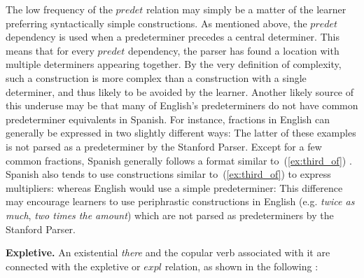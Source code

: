 \documentclass[main.tex]{subfiles}
\begin{document}
The low frequency of the $predet$ relation may simply be a matter of the learner preferring syntactically simple constructions. As mentioned above, the $predet$ dependency is used when a predeterminer precedes a central determiner. This means that for every $predet$ dependency, the parser has found a location with multiple determiners appearing together. By the very definition of complexity, such a construction is more complex than a construction with a single determiner, and thus likely to be avoided by the learner. Another likely source of this underuse may be that many of English's predeterminers do not have common predeterminer equivalents in Spanish. For instance, fractions in English can generally be expressed in two slightly different ways:
The latter of these examples is not parsed as a predeterminer by the Stanford Parser. Except for a few common fractions, Spanish generally follows a format similar to~(\ref{ex:third_of}) \citep[pp. 122-3]{butt}. Spanish also tends to use constructions similar to~(\ref{ex:third_of}) to express multipliers:
whereas English would use a simple predeterminer:
This difference may encourage learners to use periphrastic constructions in English (e.g. \textit{twice as much}, \textit{two times the amount}) which are not parsed as predeterminers by the Stanford Parser.


\textbf{Expletive.} An existential \textit{there} and the copular verb associated with it are connected with the expletive or $expl$ relation, as shown in the following \citep[pp. 126-7]{quirk:1985}: 
\end{document}
